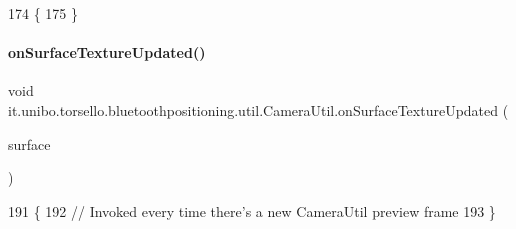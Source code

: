 \begin{DoxyCode}
174                                                                                            \{
175     \}
\end{DoxyCode}
\hypertarget{classit_1_1unibo_1_1torsello_1_1bluetoothpositioning_1_1util_1_1CameraUtil_aede93d13d58ef68302980917ac06612a_aede93d13d58ef68302980917ac06612a}{}\label{classit_1_1unibo_1_1torsello_1_1bluetoothpositioning_1_1util_1_1CameraUtil_aede93d13d58ef68302980917ac06612a_aede93d13d58ef68302980917ac06612a} 
\paragraph{\texorpdfstring{on\+Surface\+Texture\+Updated()}{onSurfaceTextureUpdated()}}
{\footnotesize\ttfamily void it.\+unibo.\+torsello.\+bluetoothpositioning.\+util.\+Camera\+Util.\+on\+Surface\+Texture\+Updated (\begin{DoxyParamCaption}\item[{Surface\+Texture}]{surface }\end{DoxyParamCaption})}


\begin{DoxyCode}
191                                                                 \{
192         \textcolor{comment}{// Invoked every time there's a new CameraUtil preview frame}
193     \}
\end{DoxyCode}
\hypertarget{classit_1_1unibo_1_1torsello_1_1bluetoothpositioning_1_1util_1_1CameraUtil_af983e424981a3991fd9d241217328bc8_af983e424981a3991fd9d241217328bc8}{}\label{classit_1_1unibo_1_1torsello_1_1bluetoothpositioning_1_1util_1_1CameraUtil_af983e424981a3991fd9d241217328bc8_af983e424981a3991fd9d241217328bc8} 
